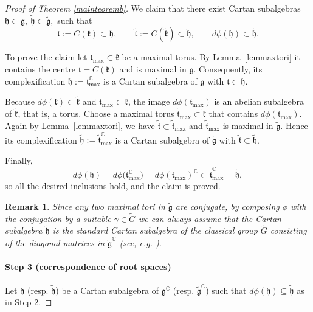 \documentclass[reqno]{amsart}
\newcommand{\C}{\mathds{C}}
\newtheorem{remark}{Remark}
\begin{document}
\begin{proof}[Proof of Theorem \ref{mainteoremb}]
\medskip 
We claim that  there  exist Cartan subalgebras
$\mathfrak h \subset \mathfrak g,\
  \tilde{\mathfrak h} \subset \tilde{\mathfrak g},$
such that
\[
  \mathfrak t := C(\mathfrak k) \subset \mathfrak h, \qquad
  \tilde{\mathfrak t} := C(\tilde{\mathfrak k}) \subset \tilde{\mathfrak h}, \qquad
  d\phi(\mathfrak h) \subset \tilde{\mathfrak h}.
\]

To prove the claim let $\mathfrak t_{\max} \subset \mathfrak k$ be a maximal torus. By Lemma~\ref{lemmaxtori} it contains the centre $\mathfrak t = C(\mathfrak k)$ and is maximal in $\mathfrak g$. Consequently, its complexification 
$\mathfrak h := \mathfrak t_{\max}^{\mathbb C}$
is a Cartan subalgebra of $\mathfrak g$ with $\mathfrak t \subset \mathfrak h$.

Because $d\phi(\mathfrak k) \subset \tilde{\mathfrak k}$ and $\mathfrak t_{\max} \subset \mathfrak k$, the image $d\phi(\mathfrak t_{\max})$ is an abelian subalgebra of $\tilde{\mathfrak k}$, that is, a torus. Choose a maximal torus $\tilde{\mathfrak t}_{\max} \subset \tilde{\mathfrak k}$ that contains $d\phi(\mathfrak t_{\max})$. Again by Lemma~\ref{lemmaxtori}, we have $\tilde{\mathfrak t} \subset \tilde{\mathfrak t}_{\max}$ and $\tilde{\mathfrak t}_{\max}$ is maximal in $\tilde{\mathfrak g}$. Hence its complexification
$\tilde{\mathfrak h} := \tilde{\mathfrak t}_{\max}^{\mathbb C}$
is a Cartan subalgebra of $\tilde{\mathfrak g}$ with $\tilde{\mathfrak t} \subset \tilde{\mathfrak h}$.

Finally,
\[
  d\phi(\mathfrak h)
    = d\phi\bigl(\mathfrak t_{\max}^{\mathbb C}\bigr)
    = d\phi(\mathfrak t_{\max})^{\mathbb C}
    \subset \tilde{\mathfrak t}_{\max}^{\mathbb C}
    = \tilde{\mathfrak h},
\]
so all the desired inclusions hold, and the claim is proved.


\begin{remark}\rm\label{rmknew}
Since any two maximal tori in $\tilde{\mathfrak{g}}$ are conjugate, by composing $\phi$ with the conjugation by a suitable $\gamma \in \tilde G$ we can always assume that the Cartan subalgebra $\tilde{\mathfrak{h}}$ is the standard Cartan subalgebra of the classical group $\tilde G$ consisting of the diagonal matrices in $\tilde{\mathfrak{g}}^{\C}$ (see, e.g.  \cite[Sect. 2. Ch. III]{Helgason}).
\end{remark}

\smallskip 

\paragraph{\bf Step 3 (correspondence of root spaces)}
Let  $\mathfrak{h}$ (resp. $\tilde{\mathfrak{h}}$) be a Cartan subalgebra of $\mathfrak{g}^{\C}$ (resp. $\tilde{\mathfrak{g}}^{\C}$) such that  $d \phi(\mathfrak{h})\subseteq \tilde{\mathfrak{h}}$ as in Step 2. 



\end{proof}
\end{document}
